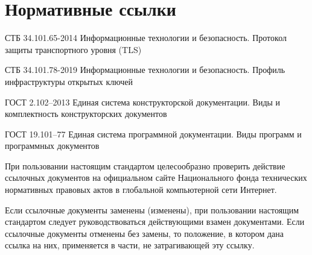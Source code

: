 \chapter{Нормативные ссылки}\label{REFS}

СТБ 34.101.65-2014 Информационные технологии и безопасность. Протокол защиты 
транспортного уровня (TLS)

СТБ 34.101.78-2019 Информационные технологии и безопасность. Профиль 
инфраструктуры открытых ключей

ГОСТ 2.102–2013 Единая система конструкторской документации. Виды и 
комплектность конструкторских документов

ГОСТ 19.101–77 Единая система программной документации. Виды программ и 
программных документов

\begin{note*}
При пользовании настоящим стандартом целесообразно проверить действие
ссылочных документов на официальном сайте Национального фонда
технических нормативных правовых актов в глобальной компьютерной сети Интернет.

Если ссылочные документы заменены (изменены),  при пользовании
настоящим стандартом следует руководствоваться действующими взамен
документами. Если ссылочные документы отменены без замены, то положение, в 
котором дана ссылка на них, применяется в части, не затрагивающей эту ссылку.
\end{note*}


